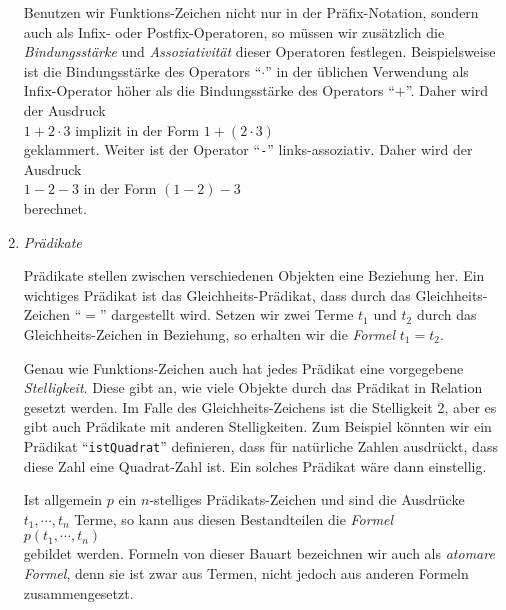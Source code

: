 \begin{enumerate}
      Benutzen wir Funktions-Zeichen nicht nur in der Pr\"afix-Notation, sondern auch als Infix- oder
      Postfix-Operatoren, so m\"ussen wir zus\"atzlich die \emph{Bindungsst\"arke} und
      \emph{Assoziativit\"at} dieser Operatoren festlegen.  Beispielsweise ist die Bindungsst\"arke des
      Operators ``$\cdot$'' in der \"ublichen Verwendung als Infix-Operator h\"oher als die
      Bindungsst\"arke des Operators ``$+$''.  Daher wird der Ausdruck
      \\[0.2cm]
      \hspace*{1.3cm}
      $1 + 2 \cdot 3$ \quad implizit in der Form \quad $1 + (2 \cdot 3)$
      \\[0.2cm]
      geklammert.  Weiter ist der Operator ``\texttt{-}'' links-assoziativ.  Daher wird der Ausdruck
      \\[0.2cm]
      \hspace*{1.3cm}
      $1 - 2 - 3$ \quad in der Form \quad $(1 - 2) - 3$
      \\[0.2cm]
      berechnet.
\item \emph{Pr\"adikate}

      Pr\"adikate stellen zwischen verschiedenen Objekten eine Beziehung her.  Ein wichtiges Pr\"adikat
      ist das Gleichheits-Pr\"adikat, dass durch das Gleichheits-Zeichen ``$=$'' dargestellt
      wird. Setzen wir zwei Terme $t_1$ und $t_2$ durch das Gleichheits-Zeichen in Beziehung,
      so erhalten wir die \emph{Formel} $t_1 = t_2$.

      Genau wie Funktions-Zeichen auch hat jedes Pr\"adikat eine vorgegebene \emph{Stelligkeit}.
      Diese gibt an, wie viele Objekte durch das Pr\"adikat in Relation gesetzt werden.  Im Falle des
      Gleichheits-Zeichens ist die Stelligkeit 2, aber es gibt auch Pr\"adikate mit anderen Stelligkeiten.
      Zum Beispiel k\"onnten wir ein Pr\"adikat ``\texttt{istQuadrat}'' definieren, dass f\"ur nat\"urliche
      Zahlen ausdr\"uckt, dass diese Zahl eine Quadrat-Zahl ist.  Ein solches Pr\"adikat w\"are dann
      einstellig.

      Ist allgemein $p$ ein $n$-stelliges Pr\"adikats-Zeichen und sind die
      Ausdr\"ucke $t_1, \cdots, t_n$
      Terme, so kann aus diesen Bestandteilen die \emph{Formel} \\[0.2cm]
      \hspace*{1.3cm} $p(t_1,\cdots,t_n)$ \\[0.2cm]
      gebildet werden.  Formeln von dieser Bauart bezeichnen wir auch als \emph{atomare Formel}, denn
      sie ist zwar aus Termen, nicht jedoch aus anderen Formeln zusammengesetzt.


\end{enumerate}
